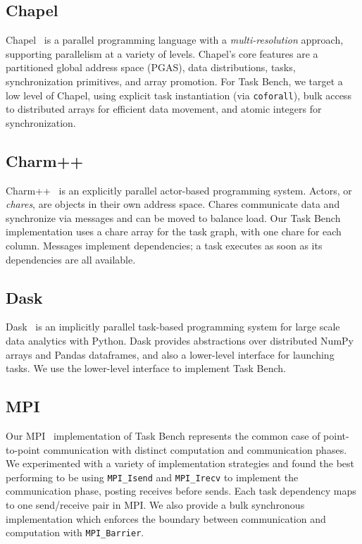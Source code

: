 \subsection{Chapel}

Chapel~\cite{Chapel15} is a parallel programming language
with a \emph{multi-res\-o\-lu\-tion} approach, supporting parallelism at a variety of
levels. Chapel's core features are a partitioned global address space
(PGAS), data distributions, tasks,
synchronization primitives, and array promotion. For Task Bench, we target a low level of
Chapel, using explicit task instantiation (via
\lstinline[language=Chapel]{coforall}), bulk access to distributed
arrays for efficient data movement, and atomic integers for
synchronization.

\subsection{Charm++}

Charm++~\cite{Charmpp93} is an explicitly parallel actor-based programming system. Actors, or
\emph{chares}, are objects in their own address space.
Chares communicate data and synchronize via messages and can be moved
to balance load. Our Task Bench implementation uses a chare
array for the task graph, with one chare for each column. Messages implement dependencies; a task executes as soon as its
dependencies are all available.



\subsection{Dask}

Dask~\cite{Dask15} is an implicitly parallel task-based programming system for large
scale data analytics with Python. Dask provides abstractions over
distributed NumPy arrays and Pandas dataframes, and also a lower-level
interface for launching tasks. We use the lower-level interface to
implement Task Bench.

\subsection{MPI}

Our MPI~\cite{MPI} implementation of Task Bench represents the common
case of point-to-point communication with distinct computation and
communication phases. We experimented with a variety of implementation
strategies and found the best performing to be using
\lstinline[language=C++]{MPI_Isend} and
\lstinline[language=C++]{MPI_Irecv} to implement the communication
phase, posting receives before sends. Each task dependency maps to one
send/receive pair in MPI. We also provide a bulk synchronous
implementation which enforces the boundary between communication and
computation with \lstinline[language=C++]{MPI_Barrier}.

